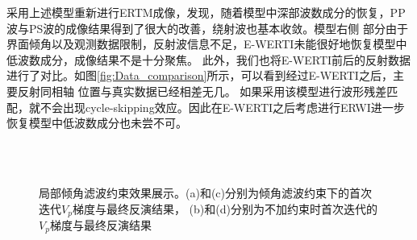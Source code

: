 采用上述模型重新进行ERTM成像，发现，随着模型中深部波数成分的恢复，PP波与PS波的成像结果得到了很大的改善，绕射波也基本收敛。模型右侧
部分由于界面倾角以及观测数据限制，反射波信息不足，E-WERTI未能很好地恢复模型中低波数成分，成像结果不是十分聚焦。
此外，我们也将E-WERTI前后的反射数据进行了对比。如图\ref{fig:Data_comparison}所示，可以看到经过E-WERTI之后，主要反射同相轴
位置与真实数据已经相差无几。
如果采用该模型进行波形残差匹配，就不会出现cycle-skipping效应。因此在E-WERTI之后考虑进行ERWI进一步恢复模型中低波数成分也未尝不可。
\begin{figure}[!htb]
   \centering
   \\
   \\
   \caption{局部倾角滤波约束效果展示。(a)和(c)分别为倾角滤波约束下的首次迭代$V_p$梯度与最终反演结果，
   (b)和(d)分别为不加约束时首次迭代的$V_p$梯度与最终反演结果}
   \label{fig:LSF_comparison}
\end{figure}

